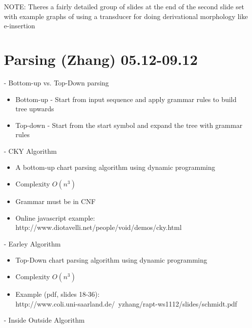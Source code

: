 \documentclass[11pt]{article}
\newenvironment{itemise}{
\begin{itemize}
  \setlength{\itemsep}{1pt}
  \setlength{\parskip}{0pt}
  \setlength{\parsep}{0pt}
}{\end{itemize}}
\begin{document}
NOTE: Theres a fairly detailed group of slides at the end of the second slide set with example graphs  of using a transducer for doing derivational morphology like e-insertion


\section{Parsing (Zhang) 05.12-09.12}

- Bottom-up vs. Top-Down parsing
\begin{itemise}
 \item Bottom-up - Start from input sequence and apply grammar rules to build tree upwards
 \item Top-down - Start from the start symbol and expand the tree with grammar rules
\end{itemise}
- CKY Algorithm
\begin{itemise}
 \item A bottom-up chart parsing algorithm using dynamic programming
 \item Complexity $O(n^3)$ 
 \item Grammar must be in CNF
 \item Online javascript example: http://www.diotavelli.net/people/void/demos/cky.html
\end{itemise}
- Earley Algorithm
\begin{itemise}
 \item Top-Down chart parsing algorithm using dynamic programming
 \item Complexity $O(n^3)$
 \item Example (pdf, slides 18-36): \\http://www.coli.uni-saarland.de/~yzhang/rapt-ws1112/slides/schmidt.pdf
\end{itemise}
- Inside Outside Algorithm
\end{document}
